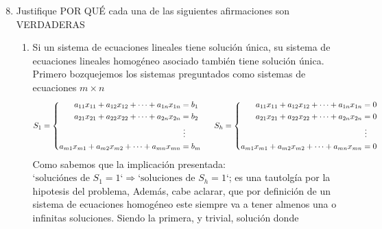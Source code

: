 \documentclass{article}
\begin{document}
\begin{enumerate}
    \setcounter{enumi}{7}
    \item Justifique POR QUÉ cada una de las siguientes afirmaciones son VERDADERAS
        \begin{enumerate}[label=\listAlph]
			\item Si un sistema de ecuaciones lineales tiene solución única, su sistema de ecuaciones lineales homogéneo asociado también tiene solución única. \\
                Primero bozquejemos los sistemas preguntados como sistemas de ecuaciones \(m \times n\)
                \[
                    S_1 =
                    \left\{
                        \begin{aligned}
                            a_{11}x_{11} + a_{12}x_{12} + \cdots + a_{1n}x_{1n} &= b_1 \\
                            a_{21}x_{21} + a_{22}x_{22} + \cdots + a_{2n}x_{2n} &= b_2 \\
                            & \hspace{0.75ex}\vdots \\
                            a_{m1}x_{m1} + a_{m2}x_{m2} + \cdots + a_{mn}x_{mn} &= b_m \\
                        \end{aligned}
                    \right.
                    \hspace{0.5cm}
                    S_h = 
                    \left\{
                        \begin{aligned}
                            a_{11}x_{11} + a_{12}x_{12} + \cdots + a_{1n}x_{1n} &= 0 \\
                            a_{21}x_{21} + a_{22}x_{22} + \cdots + a_{2n}x_{2n} &= 0 \\
                            & \hspace{0.75ex}\vdots \\
                            a_{m1}x_{m1} + a_{m2}x_{m2} + \cdots + a_{mn}x_{mn} &= 0 \\
                        \end{aligned}
                    \right.
                \]
                Como sabemos que la implicación presentada: \(\text{`soluciónes de }S_1 = 1\text{`} \Rightarrow \text{`soluciones de }S_h = 1\text{`}\); es una tautolgía por la hipotesis del problema, 
                Además, cabe aclarar, que por definición de un sistema de ecuaciones homogéneo este siempre va a tener almenos una o infinitas soluciones. Siendo la primera, y trivial, solución donde 

\end{enumerate}
\end{enumerate}
\end{document}
